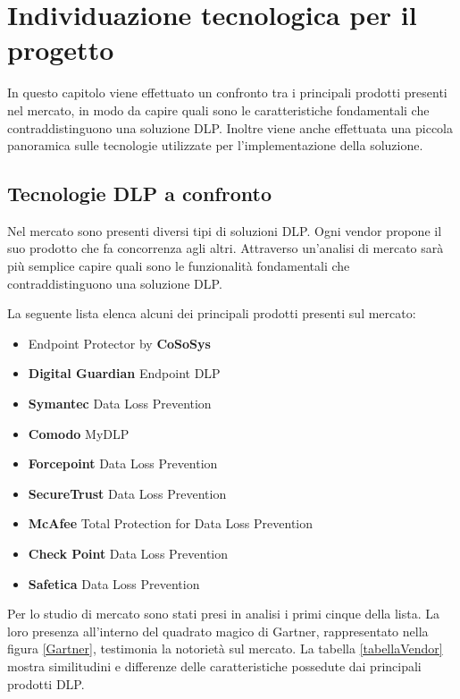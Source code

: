 \chapter{Individuazione tecnologica per il progetto}

In questo capitolo viene effettuato un confronto tra i principali prodotti presenti nel mercato,
in modo da capire quali sono le caratteristiche fondamentali che contraddistinguono una soluzione DLP.
Inoltre viene anche effettuata una piccola panoramica sulle tecnologie utilizzate per l'implementazione
della soluzione.

\section{Tecnologie DLP a confronto}
Nel mercato sono presenti diversi tipi di soluzioni DLP. Ogni vendor propone il suo prodotto che fa 
concorrenza agli altri. Attraverso un'analisi di mercato sarà più semplice capire quali sono le funzionalità
fondamentali che contraddistinguono una soluzione DLP.

La seguente lista elenca alcuni dei principali prodotti presenti sul mercato:

\begin{itemize}
    \item Endpoint Protector by \textbf{CoSoSys}
    \item \textbf{Digital Guardian} Endpoint DLP
    \item \textbf{Symantec} Data Loss Prevention
    \item \textbf{Comodo} MyDLP
    \item \textbf{Forcepoint} Data Loss Prevention
    \item \textbf{SecureTrust} Data Loss Prevention
    \item \textbf{McAfee} Total Protection for Data Loss Prevention
    \item \textbf{Check Point} Data Loss Prevention
    \item \textbf{Safetica} Data Loss Prevention
  \end{itemize}

  Per lo studio di mercato sono stati presi in analisi i primi cinque della lista.
  La loro presenza all'interno del quadrato magico di Gartner, rappresentato nella figura \ref{Gartner},
  testimonia la notorietà sul mercato.
  La tabella \ref{tabellaVendor} mostra similitudini e differenze delle caratteristiche possedute dai 
  principali prodotti DLP.

